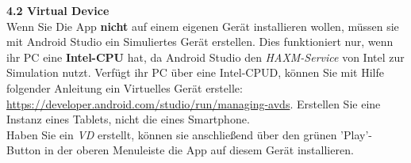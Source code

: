 \begin{itemize}
		\subitem \textbf{4.2 Virtual Device}\\
			Wenn Sie Die App \textbf{nicht} auf einem eigenen Gerät installieren wollen, müssen sie mit Android Studio ein Simuliertes Gerät erstellen. Dies funktioniert nur, wenn ihr PC eine \textbf{Intel-CPU} hat, da Android Studio den \textit{HAXM-Service} von Intel zur Simulation nutzt. Verfügt ihr PC über eine Intel-CPUD, können Sie mit Hilfe folgender Anleitung ein Virtuelles Gerät erstelle: \url{https://developer.android.com/studio/run/managing-avds}. Erstellen Sie eine Instanz eines Tablets, nicht die eines Smartphone. \\
			Haben Sie ein \textit{VD} erstellt, können sie anschließend über den grünen 'Play'-Button in der oberen Menuleiste die App auf diesem Gerät installieren. 
\end{itemize}


